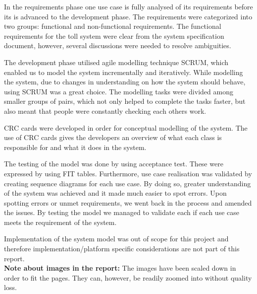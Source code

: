 In the requirements phase one use case is fully analysed of its requirements before its is advanced to the development phase. The requirements were categorized into two groups: functional and non-functional requirements. The functional requirements for the toll system were clear from the system specification document, however, several discussions were needed to resolve ambiguities.

The development phase utilised agile modelling technique SCRUM, which enabled us to model the system incrementally and iteratively. While modelling the system, due to changes in understanding on how the system should behave, using SCRUM was a great choice.  The modelling tasks were divided among smaller groups of pairs, which not only helped to complete the tasks faster, but also meant that people were constantly checking each others work. 

CRC cards were developed in order for conceptual modelling of the system. The use of CRC cards gives the developers an overview of what each class is responsible for and what it does in the system. 

The testing of the model was done by using acceptance test. These were expressed by using FIT tables. Furthermore, use case realisation was validated by creating sequence diagrams for each use case. By doing so, greater understanding of the system was achieved and it made much easier to spot errors. Upon spotting errors or unmet requirements, we went back in the process and amended the issues. By testing the model we managed to validate each if each use case meets the requirement of the system.

Implementation of the system model was out of scope for this project and therefore implementation/platform specific considerations are not part of this report.
\\

\textbf{Note about images in the report:} The images have been scaled down in order to fit the pages. They can, however, be readily zoomed into without quality loss.
